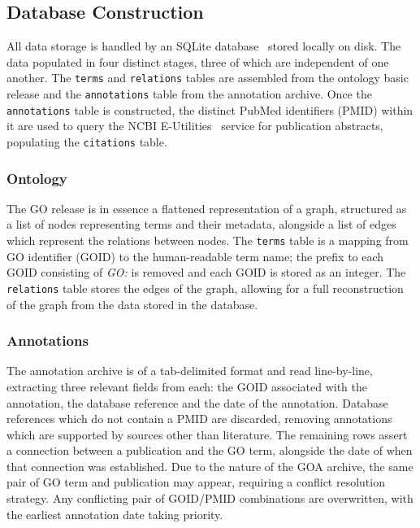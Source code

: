 \documentclass[11pt]{article}
\theoremstyle{plain}
\theoremstyle{definition}
\begin{document}
\subsection{Database Construction}\label{sec:methods-database}

All data storage is handled by an SQLite database~\cite{gaffney/2022/sqlite} stored locally on disk. The data populated in four distinct stages, three of which are independent of one another. The \verb|terms| and \verb|relations| tables are assembled from the ontology basic release and the \verb|annotations| table from the annotation archive. Once the \verb|annotations| table is constructed, the distinct PubMed identifiers (PMID) within it are used to query the NCBI E-Utilities~\cite{sayers/2024/database} service for publication abstracts, populating the  \verb|citations| table.

\subsubsection{Ontology}\label{sec:methods-database-ontology}

The GO release is in essence a flattened representation of a graph, structured as a list of nodes representing terms and their metadata, alongside a list of edges which represent the relations between nodes. The \verb|terms| table is a mapping from GO identifier (GOID) to the human-readable term name; the prefix to each GOID consisting of \textit{GO:} is removed and each GOID is stored as an integer. The \verb|relations| table stores the edges of the graph, allowing for a full reconstruction of the graph from the data stored in the database.

\subsubsection{Annotations}\label{sec:methods-database-annotations}

The annotation archive is of a tab-delimited format and read line-by-line, extracting three relevant fields from each: the GOID associated with the annotation, the database reference and the date of the annotation. Database references which do not contain a PMID are discarded, removing annotations which are supported by sources other than literature. The remaining rows assert a connection between a publication and the GO term, alongside the date of when that connection was established. Due to the nature of the GOA archive, the same pair of GO term and publication may appear, requiring a conflict resolution strategy. Any conflicting pair of GOID/PMID combinations are overwritten, with the earliest annotation date taking priority.
\end{document}
